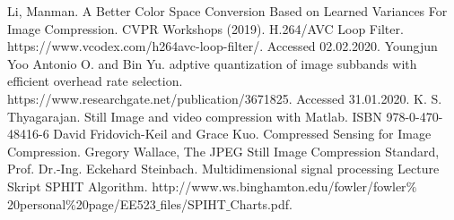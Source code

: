 \documentclass[twocolumn]{article}  %
\begin{document}
\begin{thebibliography}{50} %
Li, Manman.  A Better Color Space Conversion Based on Learned Variances For Image Compression. CVPR Workshops (2019).
H.264/AVC Loop Filter. https://www.vcodex.com/h264avc-loop-filter/. Accessed 02.02.2020.
Youngjun Yoo Antonio O. and Bin Yu. adptive quantization of image subbands with efficient overhead rate selection.  https://www.researchgate.net/publication/3671825.
Accessed 31.01.2020.
 K. S. Thyagarajan. Still Image and video compression with Matlab. ISBN 978-0-470-48416-6 
 David Fridovich-Keil and Grace Kuo. Compressed Sensing for Image Compression.
 Gregory Wallace, The JPEG Still Image Compression Standard, 
 Prof. Dr.-Ing. Eckehard Steinbach. Multidimensional signal processing Lecture Skript
 SPHIT Algorithm. http://www.ws.binghamton.edu/fowler/fowler$\%$20personal$\%$20page/EE523$\_$files/SPIHT$\_$Charts.pdf. 
\end{thebibliography}
\end{document}
